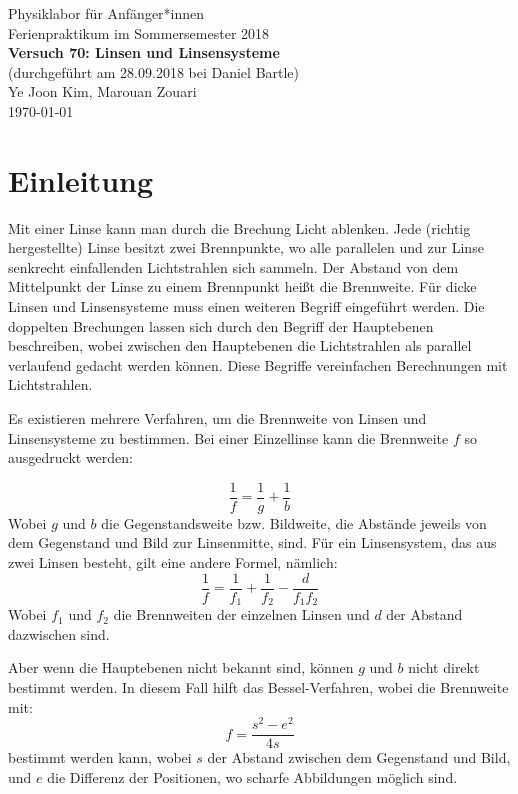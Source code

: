 \documentclass[11pt,a4paper]{article}
\begin{document}
	

{
	\centering 
	\large 
	Physiklabor für Anfänger*innen \\
	Ferienpraktikum im Sommersemester 2018 \\[4mm]
	\textbf{\LARGE 
		Versuch 70: Linsen und Linsensysteme
	} \\[3mm]
	(durchgeführt am 28.09.2018 bei Daniel Bartle) \\
	Ye Joon Kim, Marouan Zouari\\
	\today \\[10mm]
}
\tableofcontents
\newpage
\section{Einleitung}
Mit einer Linse kann man durch die Brechung Licht ablenken. Jede (richtig hergestellte) Linse besitzt zwei Brennpunkte, wo alle parallelen und zur Linse senkrecht einfallenden Lichtstrahlen sich sammeln. Der Abstand von dem Mittelpunkt der Linse zu einem Brennpunkt heißt die Brennweite. Für dicke Linsen und Linsensysteme muss einen weiteren Begriff eingeführt werden. Die doppelten Brechungen lassen sich durch den Begriff der Hauptebenen beschreiben, wobei zwischen den Hauptebenen die Lichtstrahlen als parallel verlaufend gedacht werden können. Diese Begriffe vereinfachen Berechnungen mit Lichtstrahlen. 

Es existieren mehrere Verfahren, um die Brennweite von Linsen und Linsensysteme zu bestimmen. Bei einer Einzellinse kann die Brennweite $f$ so ausgedruckt werden: 

\begin{equation}
\frac{1}{f} = \frac{1}{g} + \frac{1}{b}
\end{equation}
Wobei $g$ und $b$ die Gegenstandsweite bzw. Bildweite, die Abstände jeweils von dem Gegenstand und Bild zur Linsenmitte, sind.
Für ein Linsensystem, das aus zwei Linsen besteht, gilt eine andere Formel, nämlich:
\begin{equation}
\frac{1}{f} = \frac{1}{f_1}+\frac{1}{f_2}-\frac{d}{f_1f_2}
\end{equation}
Wobei $f_1$ und $f_2$ die Brennweiten der einzelnen Linsen und $d$ der Abstand dazwischen sind. 

Aber wenn die Hauptebenen nicht bekannt sind, können $g$ und $b$ nicht direkt bestimmt werden. In diesem Fall hilft das Bessel-Verfahren, wobei die Brennweite mit:
\begin{equation}
f = \frac{s^2-e^2}{4s}
\end{equation}
bestimmt werden kann, wobei $s$ der Abstand zwischen dem Gegenstand und Bild, und $e$ die Differenz der Positionen, wo scharfe Abbildungen möglich sind. 
\end{document}
